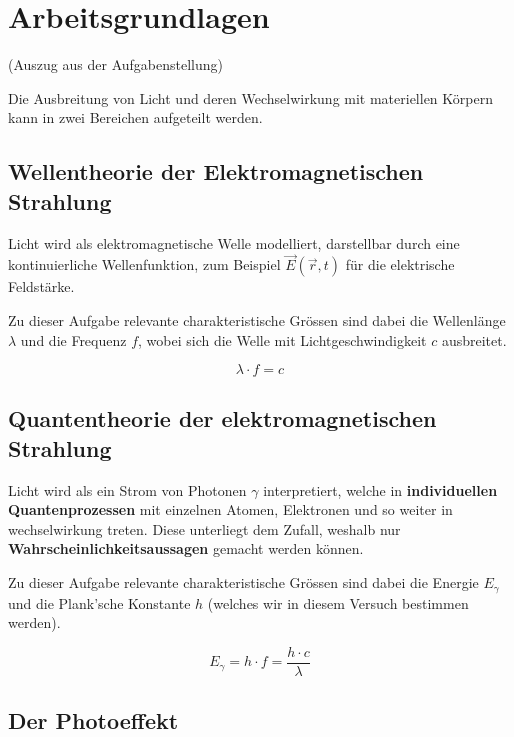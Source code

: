 \section{Arbeitsgrundlagen}

(Auszug aus der Aufgabenstellung\cite{ref:aufgabenstellung})

Die Ausbreitung von Licht und deren Wechselwirkung mit  materiellen  K\"orpern
kann in zwei Bereichen aufgeteilt werden.


\subsection{Wellentheorie der Elektromagnetischen Strahlung}

Licht wird als elektromagnetische  Welle  modelliert,  darstellbar  durch eine
kontinuierliche Wellenfunktion,  zum  Beispiel  $\vec{E}(\vec{r},t)$ f\"ur die
elektrische Feldst\"arke.

Zu  dieser  Aufgabe  relevante  charakteristische  Gr\"ossen  sind  dabei  die
Wellenl\"ange  $\lambda$  und  die  Frequenz  $f$, wobei sich  die  Welle  mit
Lichtgeschwindigkeit $c$ ausbreitet.

\begin{equation}
    \lambda \cdot f = c
\end{equation}


\subsection{Quantentheorie der elektromagnetischen Strahlung}

Licht  wird  als  ein  Strom  von  Photonen $\gamma$ interpretiert, welche  in
\textbf{individuellen Quantenprozessen} mit  einzelnen  Atomen, Elektronen und
so weiter  in  wechselwirkung treten. Diese unterliegt dem Zufall, weshalb nur
\textbf{Wahrscheinlichkeitsaussagen} gemacht werden k\"onnen.

Zu dieser Aufgabe relevante charakteristische Gr\"ossen sind dabei die Energie
$E_{\gamma}$ und die Plank'sche Konstante  $h$  (welches wir in diesem Versuch
bestimmen werden).

\begin{equation}
    E_{\gamma} = h \cdot f = \frac{h \cdot c}{\lambda}
\end{equation}


\subsection{Der Photoeffekt}

